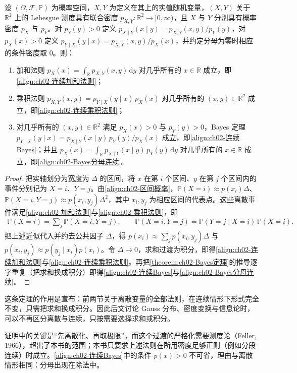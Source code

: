 \documentclass[../../main.tex]{subfiles}
\begin{document}
\begin{theorem}\label{theorem:ch02-连续形式法则}
设 $(\Omega,\mathcal{F},\mathbb{P})$ 为概率空间，$X,Y$ 为定义在其上的实值随机变量，$(X,Y)$ 关于 $\mathbb{R}^{2}$ 上的 Lebesgue 测度具有联合密度 $p_{X,Y}:\mathbb{R}^{2}\to[0,\infty)$，且 $X$ 与 $Y$ 分别具有概率密度 $p_X$ 与 $p_Y$。对 $p_Y(y)>0$ 定义 $p_{X\mid Y}(x\mid y)=p_{X,Y}(x,y)/p_Y(y)$，对 $p_X(x)>0$ 定义 $p_{Y\mid X}(y\mid x)=p_{X,Y}(x,y)/p_X(x)$，并约定分母为零时相应的条件密度取 $0$。则：
\begin{enumerate}
  \item 加和法则 $p_X(x)=\int_{\mathbb{R}}p_{X,Y}(x,y)\,\mathrm{d}y$ 对几乎所有的 $x\in\mathbb{R}$ 成立，即\eqref{align:ch02-连续加和法则}；
  \item 乘积法则 $p_{X,Y}(x,y)=p_{Y\mid X}(y\mid x)\,p_X(x)$ 对几乎所有的 $(x,y)\in\mathbb{R}^{2}$ 成立，即\eqref{align:ch02-连续乘积法则}；
  \item 对几乎所有的 $(x,y)\in\mathbb{R}^{2}$ 满足 $p_X(x)>0$ 与 $p_Y(y)>0$，Bayes 定理 $p_{Y\mid X}(y\mid x)=p_{X\mid Y}(x\mid y)\,p_Y(y)/p_X(x)$ 成立，即\eqref{align:ch02-连续Bayes}；并且 $p_X(x)=\int_{\mathbb{R}}p_{X\mid Y}(x\mid y)\,p_Y(y)\,\mathrm{d}y$ 对几乎所有的 $x\in\mathbb{R}$ 成立，即\eqref{align:ch02-Bayes分母连续}。
\end{enumerate}
\end{theorem}

\begin{proof}
把实轴划分为宽度为 $\Delta$ 的区间，将 $x$ 在第 $i$ 个区间、$y$ 在第 $j$ 个区间内的事件分别记为 $X=i$、$Y=j$。由\eqref{align:ch02-区间概率}，$\mathbb{P}(X=i)\approx p(x_i)\Delta$、$\mathbb{P}(X=i,Y=j)\approx p(x_i,y_j)\Delta^2$，其中 $x_i,y_j$ 为相应区间的代表点。这些离散事件满足\eqref{align:ch02-加和法则}与\eqref{align:ch02-乘积法则}，即
\begin{align*}
 \mathbb{P}(X=i) = \sum_{j}\mathbb{P}(X=i,Y=j),\qquad
 \mathbb{P}(X=i,Y=j) = \mathbb{P}(Y=j\mid X=i)\,\mathbb{P}(X=i) .
\end{align*}
把上述近似代入并约去公共因子 $\Delta$，得 $p(x_i)\approx\sum_j p(x_i,y_j)\Delta$ 与 $p(x_i,y_j)\approx p(y_j\mid x_i)p(x_i)$。令 $\Delta\to0$，求和过渡为积分，即得\eqref{align:ch02-连续加和法则}与\eqref{align:ch02-连续乘积法则}。再把\cref{theorem:ch02-Bayes定理}的推导逐字重复（把求和换成积分）即得\eqref{align:ch02-连续Bayes}与\eqref{align:ch02-Bayes分母连续}。
\end{proof}

\begin{remark}
这条定理的作用是宣布：前两节关于离散变量的全部法则，在连续情形下形式完全不变，只需把求和换成积分。因此后文讨论 Gauss 分布、密度变换与信息论时，可以不再区分离散与连续，只按需要选择求和或积分。

证明中的关键是“先离散化、再取极限”，而这个过渡的严格化需要测度论（Feller, 1966），超出了本书的范围；本书只要求上述法则在所用密度足够正则（例如分段连续）时成立。\eqref{align:ch02-连续Bayes}中的条件 $p(x)>0$ 不可省，理由与离散情形相同：分母出现在除法中。
\end{remark}
\end{document}
